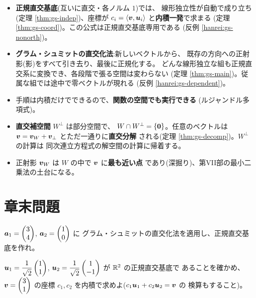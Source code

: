 \begin{matome}
\begin{itemize}
\item \textbf{正規直交基底}(互いに直交・各ノルム $1$)では、
線形独立性が自動で成り立ち(定理 \ref{thm:gs-indep})、座標が
$c_i = \langle \bm{v}, \bm{u}_i \rangle$ と\textbf{内積一発}で求まる
(定理 \ref{thm:gs-coord})。この公式は正規直交基底専用である
(反例 \ref{hanrei:gs-nonorth})。
\item \textbf{グラム・シュミットの直交化法}:新しいベクトルから、
既存の方向への正射影(影)をすべて引き去り、最後に正規化する。
どんな線形独立な組も正規直交系に変換でき、各段階で張る空間は変わらない
(定理 \ref{thm:gs-main})。従属な組では途中で零ベクトルが現れる
(反例 \ref{hanrei:gs-dependent})。
\item 手順は内積だけでできるので、\textbf{関数の空間でも実行できる}
(ルジャンドル多項式)。
\item \textbf{直交補空間} $W^{\perp}$ は部分空間で、
$W \cap W^{\perp} = \{\bm{0}\}$。任意のベクトルは
$\bm{v} = \bm{v}_W + \bm{v}_{\perp}$ とただ一通りに\textbf{直交分解}
される(定理 \ref{thm:gs-decomp})。$W^{\perp}$ の計算は
同次連立方程式の解空間の計算に帰着する。
\item 正射影 $\bm{v}_W$ は $W$ の中で $\bm{v}$ に\textbf{最も近い点}
であり(深掘り)、第VII部の最小二乗法の土台になる。
\end{itemize}
\end{matome}

\section*{章末問題}

\begin{mondai}[基本]\label{q:gs-ex1}
$\bm{a}_1 = \begin{pmatrix}3 \\ 4\end{pmatrix}$, $\bm{a}_2 = \begin{pmatrix}1 \\ 0\end{pmatrix}$ に
グラム・シュミットの直交化法を適用し、正規直交基底を作れ。
\end{mondai}

\begin{mondai}[基本]\label{q:gs-ex2}
$\bm{u}_1 = \dfrac{1}{\sqrt{2}}\begin{pmatrix}1 \\ 1\end{pmatrix}$,
$\bm{u}_2 = \dfrac{1}{\sqrt{2}}\begin{pmatrix}1 \\ -1\end{pmatrix}$ が $\mathbb{R}^2$ の正規直交基底で
あることを確かめ、$\bm{v} = \begin{pmatrix}3 \\ 1\end{pmatrix}$ の座標
$c_1, c_2$ を内積で求めよ($c_1\bm{u}_1 + c_2\bm{u}_2 = \bm{v}$ の
検算もすること)。
\end{mondai}

